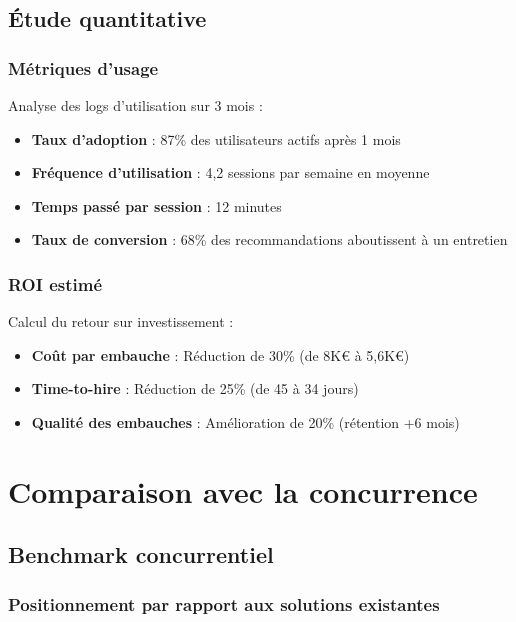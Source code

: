 \documentclass[12pt,a4paper]{report}
\begin{document}
\subsection{Étude quantitative}

\subsubsection{Métriques d'usage}

Analyse des logs d'utilisation sur 3 mois :
\begin{itemize}
\item \textbf{Taux d'adoption} : 87\% des utilisateurs actifs après 1 mois
\item \textbf{Fréquence d'utilisation} : 4,2 sessions par semaine en moyenne
\item \textbf{Temps passé par session} : 12 minutes
\item \textbf{Taux de conversion} : 68\% des recommandations aboutissent à un entretien
\end{itemize}

\subsubsection{ROI estimé}

Calcul du retour sur investissement :
\begin{itemize}
\item \textbf{Coût par embauche} : Réduction de 30\% (de 8K€ à 5,6K€)
\item \textbf{Time-to-hire} : Réduction de 25\% (de 45 à 34 jours)
\item \textbf{Qualité des embauches} : Amélioration de 20\% (rétention +6 mois)
\end{itemize}

\section{Comparaison avec la concurrence}

\subsection{Benchmark concurrentiel}

\subsubsection{Positionnement par rapport aux solutions existantes}
\end{document}
